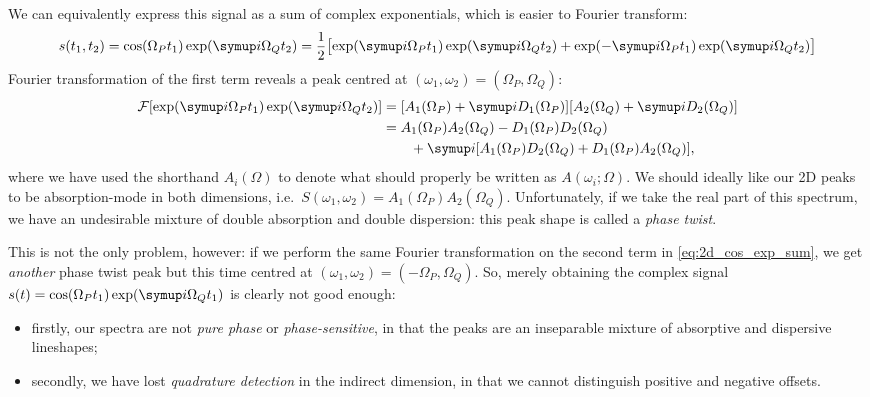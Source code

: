 We can equivalently express this signal as a sum of complex exponentials, which is easier to Fourier transform:
\begin{equation}
    \label{eq:2d_cos_exp_sum}
    s(t_1, t_2) = \cos(\Omega_P t_1)\exp(\mi \Omega_Q t_2) = \frac{1}{2}\bigl[\exp(\mi\Omega_P t_1)\exp(\mi\Omega_Q t_2) + \exp(-\mi\Omega_P t_1)\exp(\mi\Omega_Q t_2)\bigr]
\end{equation}
Fourier transformation of the first term reveals a peak centred at $(\omega_1, \omega_2) = (\Omega_P, \Omega_Q)$:
\begin{align}
    \label{eq:ft_2d_phasetwist}
    \mathcal{F}[\exp(\mi\Omega_P t_1)\exp(\mi\Omega_Q t_2)]
        &= [A_1(\Omega_P) + \mi D_1(\Omega_P)][A_2(\Omega_Q) + \mi D_2(\Omega_Q)] \notag \\
        &= A_1(\Omega_P)A_2(\Omega_Q) - D_1(\Omega_P)D_2(\Omega_Q) \notag \\
        &\quad\quad + \mi[A_1(\Omega_P)D_2(\Omega_Q) + D_1(\Omega_P)A_2(\Omega_Q)],
\end{align}
where we have used the shorthand $A_i(\Omega)$ to denote what should properly be written as $A(\omega_i;\Omega)$.
We should ideally like our 2D peaks to be absorption-mode in both dimensions, i.e.\ $S(\omega_1, \omega_2) = A_1(\Omega_P)A_2(\Omega_Q)$.
Unfortunately, if we take the real part of this spectrum, we have an undesirable mixture of double absorption and double dispersion: this peak shape is called a \textit{phase twist}.

This is not the only problem, however: if we perform the same Fourier transformation on the second term in \cref{eq:2d_cos_exp_sum}, we get \textit{another} phase twist peak but this time centred at $(\omega_1, \omega_2) = (-\Omega_P, \Omega_Q)$.
So, merely obtaining the complex signal $s(t) = \cos(\Omega_P t_1)\exp(\mi\Omega_Q t_1)$ is clearly not good enough:

\begin{itemize}
    \item firstly, our spectra are not \textit{pure phase} or \textit{phase-sensitive}, in that the peaks are an inseparable mixture of absorptive and dispersive lineshapes;
    \item secondly, we have lost \textit{quadrature detection} in the indirect dimension, in that we cannot distinguish positive and negative offsets.
\end{itemize}

